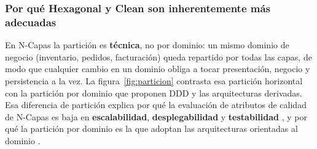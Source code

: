 \subsubsection{Por qué Hexagonal y Clean son inherentemente más adecuadas}
En N-Capas la partición es \textbf{técnica}, no por dominio: un mismo dominio de negocio (inventario, pedidos, facturación) queda repartido por todas las capas, de modo que cualquier cambio en un dominio obliga a tocar presentación, negocio y persistencia a la vez. La figura~\ref{fig:particion} contrasta esa partición horizontal con la partición por dominio que proponen DDD y las arquitecturas derivadas. Esa diferencia de partición explica por qué la evaluación de atributos de calidad de N-Capas es baja en \textbf{escalabilidad}, \textbf{desplegabilidad} y \textbf{testabilidad} \parencite{richards2015patterns}, y por qué la partición por dominio es la que adoptan las arquitecturas orientadas al dominio \parencite{torre2010guia}.

